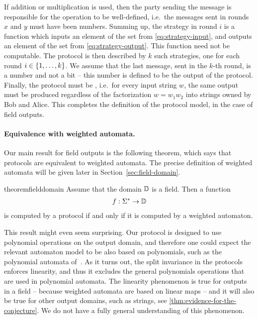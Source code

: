 If addition or multiplication is used, then the party sending the message is responsible for the operation to be well-defined, i.e.~the messages sent in rounds $x$ and $y$ must have been numbers.
Summing up, the strategy in round $i$ is a function which inputs an element of the set from \eqref{eq:strategy-input}, and outputs an element of the set from \eqref{eq:strategy-output}. This function need not be computable. The protocol is then described by $k$ such strategies, one for each round $i \in \{1,\ldots,k\}$. We assume that the last message, sent in the $k$-th round, is a number and not a bit -- this number is defined to be the output of the protocol. 
Finally, the protocol must be , i.e.~for every input string $w$, the same output must be produced regardless of the factorization $w = w_1 w_2$ into strings owned by Bob and Alice. This completes the definition of the protocol model, in the case of field outputs.


\paragraph*{Equivalence with weighted automata.} Our main result for field outputs is the following theorem, which says that protocols are equivalent to weighted automata. The precise definition of weighted automata will be given later in Section~\ref{sec:field-domain}.



\begin{restatable}{theorem}{fielddomain}
    \label{thm:field-domain}
     Assume that the domain $\mathbb D$ is a field. Then a function 
    \begin{align*}
    f : \Sigma^* \to \mathbb D
    \end{align*}  is computed by a protocol if and only if it is  computed by a weighted automaton.
\end{restatable}



  This result might even seem surprising. Our protocol is designed to use polynomial operations on the output domain, and therefore one could expect the relevant automaton model to be also based on polynomials, such as the  polynomial automata of~\cite{DBLP:conf/lics/BenediktDSW17}. As it turns out, the split invariance in the protocols  enforces linearity, and thus it excludes the general polynomials operations that are used in polynomial automata. The linearity phenomenon is true for outputs in a field -- because weighted automata are based on linear maps -- and it will also be true for other output domains, such as strings, see \cref{thm:evidence-for-the-conjecture}. We do not have a fully general understanding of this phenomenon.


